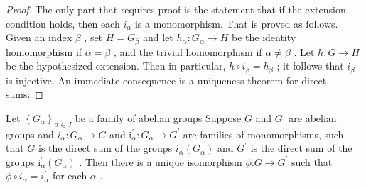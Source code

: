 \begin{proof}The only part that requires proof is the statement that if the extension condition holds, then each \({i}_{\alpha }\) is a monomorphism. That is proved as follows. Given an index \(\beta\) , set \(H = {G}_{\beta }\) and let \({h}_{\alpha } : {G}_{\alpha } \rightarrow  H\) be the identity homomorphism if \(\alpha  = \beta\) , and the trivial homomorphism if \(\alpha  \neq  \beta\) . Let \(h : G \rightarrow  H\) be the hypothesized extension. Then in particular, \(h \circ  {i}_{\beta } = {h}_{\beta }\) ; it follows that \({i}_{\beta }\) is injective.
An immediate consequence is a uniqueness theorem for direct sums:
\end{proof}
\begin{theorem} Let \({\left\{  {G}_{\alpha }\right\}  }_{\alpha  \in  J}\) be a family of abelian groups Suppose \(G\) and \({G}^{\prime }\) are abelian groups and \({i}_{\alpha } : {G}_{\alpha } \rightarrow  G\) and \({\mathrm{i}}_{\alpha }^{\prime } : {G}_{\alpha } \rightarrow  {G}^{\prime }\) are families of monomorphisms, such that \(G\) is the direct sum of the groups \({i}_{\alpha }\left( {G}_{\alpha }\right)\) and \({G}^{\prime }\) is the direct sum of the groups \({\mathrm{i}}_{\alpha }^{\prime }\left( {G}_{\alpha }\right)\) . Then there is a unique isomorphism \(\phi .G \rightarrow  {G}^{\prime }\) such that \(\phi  \circ  {i}_{\alpha } = {i}_{\alpha }^{\prime }\) for each \(\alpha\) .
\end{theorem}

